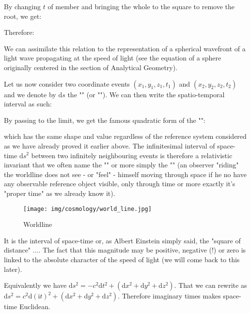 	By changing $t$ of member and bringing the whole to the square to remove the root, we get:
	
	Therefore:
	
	\begin{tcolorbox}[title=Remark,colframe=black,arc=10pt]
	We can assimilate this relation to the representation of a spherical wavefront of a light wave propagating at the speed of light (see the equation of a sphere originally centered in the section of Analytical Geometry).
	\end{tcolorbox}
	Let us now consider two coordinate events $(x_1,y_1,z_1,t_1)$ and $(x_2,y_2,z_2,t_2)$ and we denote by $\mathrm{d}s$ the "" (or ""). We can then write the spatio-temporal interval as such:
	
	By passing to the limit, we get the famous quadratic form of the "\label{interval invariant}":
	
	which has the same shape and value regardless of the reference system considered as we have already proved it earlier above. The infinitesimal interval of space-time $\mathrm{d}s^2$ between two infinitely neighbouring events is therefore a relativistic invariant that we often name the "" or more simply the "" (an observer "riding" the worldline does not see - or "feel" - himself moving through space if he no have any observable reference object visible, only through time or more exactly it's "proper time" as we already know it). 
	\begin{figure}[H]
		\centering
		\texttt{[image: img/cosmology/world\_line.jpg]}
		\caption{Worldline}	
	\end{figure}
	It is the interval of space-time or, as Albert Einstein simply said, the "square of distance" .... The fact that this magnitude may be positive, negative (!) or zero is linked to the absolute character of the speed of light (we will come back to this later).
	
	\begin{tcolorbox}[title=Remark,colframe=black,arc=10pt]
	Equivalently we have $\mathrm{d}s^2=-c^2\mathrm{d}t^2+(\mathrm{d}x^2+\mathrm{d}y^2+\mathrm{d}z^2)$. That we can rewrite as $\mathrm{d}s^2=c^2\mathrm{d}(\mathrm{i}t)^2+(\mathrm{d}x^2+\mathrm{d}y^2+\mathrm{d}z^2)$. Therefore imaginary times makes space-time Euclidean.
	\end{tcolorbox}

